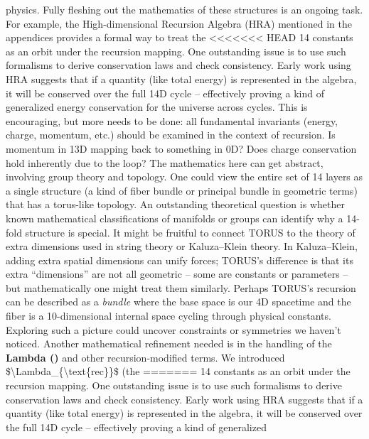 \documentclass[]{article}
\begin{document}
\begin{itemize}
  physics. Fully fleshing out the mathematics of these structures is an
  ongoing task. For example, the High-dimensional Recursion Algebra
  (HRA) mentioned in the appendices provides a formal way to treat the
<<<<<<< HEAD
  14 constants as an orbit under the recursion mapping\hspace{0pt}. One
  outstanding issue is to use such formalisms to derive conservation
  laws and check consistency. Early work using HRA suggests that if a
  quantity (like total energy) is represented in the algebra, it will be
  conserved over the full 14D cycle\hspace{0pt} -- effectively proving a
  kind of generalized energy conservation for the universe across
  cycles. This is encouraging, but more needs to be done: all
  fundamental invariants (energy, charge, momentum, etc.) should be
  examined in the context of recursion. Is momentum in 13D mapping back
  to something in 0D? Does charge conservation hold inherently due to
  the loop? The mathematics here can get abstract, involving group
  theory and topology. One could view the entire set of 14 layers as a
  single structure (a kind of fiber bundle or principal bundle in
  geometric terms) that has a torus-like topology. An outstanding
  theoretical question is whether known mathematical classifications of
  manifolds or groups can identify why a 14-fold structure is special.
  It might be fruitful to connect TORUS to the theory of extra
  dimensions used in string theory or Kaluza--Klein theory. In
  Kaluza--Klein, adding extra spatial dimensions can unify forces;
  TORUS's difference is that its extra ``dimensions'' are not all
  geometric -- some are constants or parameters -- but mathematically
  one might treat them similarly. Perhaps TORUS's recursion can be
  described as a \emph{bundle} where the base space is our 4D spacetime
  and the fiber is a 10-dimensional internal space cycling through
  physical constants. Exploring such a picture could uncover constraints
  or symmetries we haven't noticed. Another mathematical refinement
  needed is in the handling of the \textbf{Lambda (\Lambda)} and other
  recursion-modified terms. We introduced
  \$\textbackslash Lambda\_\{\textbackslash text\{rec\}\}\$ (the
=======
  14 constants as an orbit under the recursion mapping​. One outstanding
  issue is to use such formalisms to derive conservation laws and check
  consistency. Early work using HRA suggests that if a quantity (like
  total energy) is represented in the algebra, it will be conserved over
  the full 14D cycle​ -- effectively proving a kind of generalized

\end{itemize}
\end{document}
